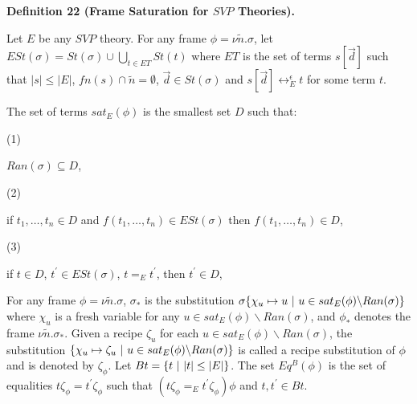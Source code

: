 \documentclass[10pt,a4paper]{amsart}
\begin{document}
 
 
\par\medskip\noindent\textbf{Definition 22 (Frame Saturation for $\mathit{SVP}$ Theories).}\par
 
 
Let $E$ be any $\mathit{SVP}$ theory. For any frame $\phi=\nu\tilde{n}.\sigma$, let $ESt(\sigma)=St(\sigma)\cup\bigcup_{t\in ET}St(t)$ where $ET$ is the set of terms $s[\vec{d}]$ such that $|s|\leq|E|$, $fn(s)\cap\tilde{n}=\emptyset$, $\vec{d}\in St(\sigma)$ and $s[\vec{d}]\leftrightarrow_{E}^{\epsilon}t$ for some term $t$.\par
 
 
 
The set of terms $sat_{E}(\phi)$ is the smallest set $D$ such that:\par
  
\par\noindent  (1) 
 
$Ran(\sigma)\subseteq D$,\par
 
 
 
\par\noindent  (2) 
 
if $t_{1},\dots,t_{n}\in D$ and $f(t_{1},\dots,t_{n})\in ESt(\sigma)$ then $f(t_{1},\dots,t_{n})\in D$,\par
 
 
 
\par\noindent  (3) 
 
if $t\in D$, $t^{\prime}\in ESt(\sigma)$, $t=_{E}t^{\prime}$, then $t^{\prime}\in D$,\par
 
 
  
 
 
For any frame $\phi=\nu\tilde{n}.\sigma$, $\sigma_{*}$ is the substitution $\sigma\{\chi_{u}\mapsto u\leavevmode\nobreak\ |\leavevmode\nobreak\ u\in sat_{%
E}(\phi)\backslash Ran(\sigma)\}$ where $\chi_{u}$ is a fresh variable for any $u\in sat_{E}(\phi)\backslash Ran(\sigma)$, and $\phi_{*}$ denotes the frame $\nu\tilde{n}.\sigma_{*}$. Given a recipe $\zeta_{u}$ for each $u\in sat_{E}(\phi)\backslash Ran(\sigma)$, the substitution $\{\chi_{u}\mapsto\zeta_{u}\leavevmode\nobreak\ |\leavevmode\nobreak\ u\in sat_%
{E}(\phi)\backslash Ran(\sigma)\}$ is called a recipe substitution of $\phi$ and is denoted by $\zeta_{\phi}$. Let $Bt=\{t\leavevmode\nobreak\ |\leavevmode\nobreak\ |t|\leq|E|\}$. The set $Eq^{B}(\phi)$ is the set of equalities $t\zeta_{\phi}=t^{\prime}\zeta_{\phi}$ such that $(t\zeta_{\phi}=_{E}t^{\prime}\zeta_{\phi})\phi$ and $t,t^{\prime}\in Bt$.\par
 
\end{document}
